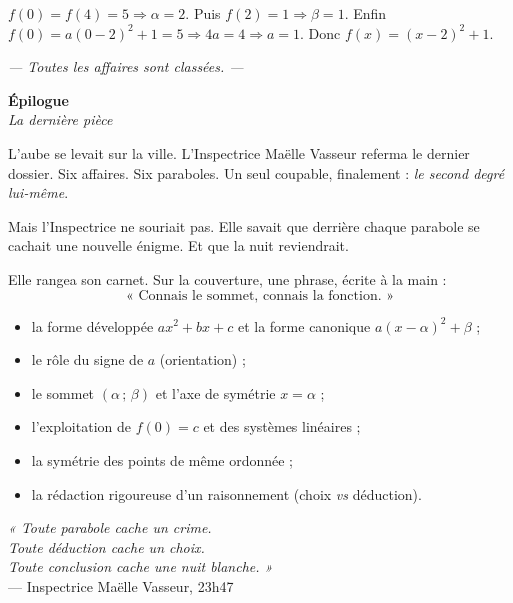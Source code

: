 \documentclass[11pt,a4paper]{article}
\newcommand{\chapterheader}[2]{%
  \clearpage
  \begin{tcolorbox}[
    enhanced,
    colback=ink, colframe=ink,
    interior style={top color=ink, bottom color=charcoal, shading angle=90},
    boxrule=0pt, arc=0pt,
    left=18pt, right=18pt, top=14pt, bottom=14pt,
    width=\textwidth,
  ]
    {\color{white}\Huge\bfseries #1}\\[6pt]
    {\color{silver}\large\itshape #2}
  \end{tcolorbox}
  \vspace{6pt}
}
\begin{document}
\begin{revelation}
$f(0) = f(4) = 5 \Rightarrow \alpha = 2$. Puis $f(2) = 1 \Rightarrow \beta = 1$. Enfin $f(0) = a(0-2)^2 + 1 = 5 \Rightarrow 4a = 4 \Rightarrow a = 1$. Donc $f(x) = (x-2)^2 + 1$.
\end{revelation}

\vfill
\begin{center}
\textcolor{slate}{\itshape\small — Toutes les affaires sont classées. —}
\end{center}

\chapterheader{Épilogue}{La dernière pièce}

L'aube se levait sur la ville. L'Inspectrice Maëlle Vasseur referma le dernier dossier. Six affaires. Six paraboles. Un seul coupable, finalement : \emph{le second degré lui-même}.

Mais l'Inspectrice ne souriait pas. Elle savait que derrière chaque parabole se cachait une nouvelle énigme. Et que la nuit reviendrait.

Elle rangea son carnet. Sur la couverture, une phrase, écrite à la main :
\[
  \boxed{\;\text{« Connais le sommet, connais la fonction. »}\;}
\]

\vspace{1cm}

\begin{indice}
\begin{itemize}[leftmargin=*]
  \item la forme développée $ax^2+bx+c$ et la forme canonique $a(x-\alpha)^2+\beta$ ;
  \item le rôle du signe de $a$ (orientation) ;
  \item le sommet $(\alpha\,;\,\beta)$ et l'axe de symétrie $x=\alpha$ ;
  \item l'exploitation de $f(0) = c$ et des systèmes linéaires ;
  \item la symétrie des points de même ordonnée ;
  \item la rédaction rigoureuse d'un raisonnement (choix \emph{vs} déduction).
\end{itemize}
\end{indice}

\vspace{1cm}

\begin{center}
\begin{tcolorbox}[
  enhanced, colback=ink, colframe=ink,
  interior style={top color=ink, bottom color=charcoal, shading angle=90},
  boxrule=0pt, arc=2mm, width=0.8\textwidth,
  left=18pt, right=18pt, top=14pt, bottom=14pt,
]
\centering
{\color{silver}\itshape « Toute parabole cache un crime.\\[2pt]
Toute déduction cache un choix.\\[2pt]
Toute conclusion cache une nuit blanche. »}\\[8pt]
{\color{gray}\small — Inspectrice Maëlle Vasseur, 23h47}
\end{tcolorbox}
\end{center}
\end{document}
